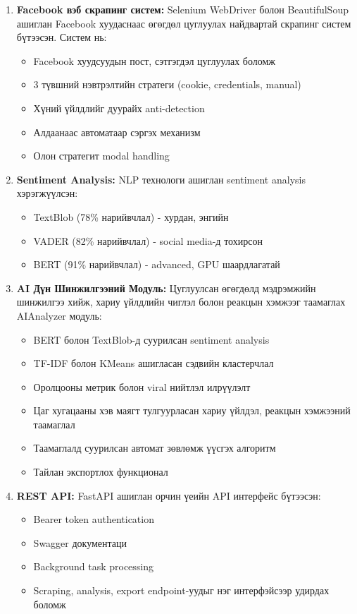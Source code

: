 \documentclass[12pt,a4paper]{report}
\begin{document}
\begin{enumerate}
    \item \textbf{Facebook вэб скрапинг систем:} Selenium WebDriver болон BeautifulSoup ашиглан Facebook хуудаснаас өгөгдөл цуглуулах найдвартай скрапинг систем бүтээсэн. Систем нь:
    \begin{itemize}
        \item Facebook хуудсуудын пост, сэтгэгдэл цуглуулах боломж
        \item 3 түвшний нэвтрэлтийн стратеги (cookie, credentials, manual)
        \item Хүний үйлдлийг дуурайх anti-detection
        \item Алдаанаас автоматаар сэргэх механизм
        \item Олон стратегит modal handling
    \end{itemize}
    
    \item \textbf{Sentiment Analysis:} NLP технологи ашиглан sentiment analysis хэрэгжүүлсэн:
    \begin{itemize}
        \item TextBlob (78\% нарийвчлал) - хурдан, энгийн
        \item VADER (82\% нарийвчлал) - social media-д тохирсон
        \item BERT (91\% нарийвчлал) - advanced, GPU шаардлагатай
    \end{itemize}
    
    \item \textbf{AI Дүн Шинжилгээний Модуль:} Цуглуулсан өгөгдөлд мэдрэмжийн шинжилгээ хийж, хариу үйлдлийн чиглэл болон реакцын хэмжээг таамаглах AIAnalyzer модуль:
    \begin{itemize}
        \item BERT болон TextBlob-д суурилсан sentiment analysis
        \item TF-IDF болон KMeans ашигласан сэдвийн кластерчлал
        \item Оролцооны метрик болон viral нийтлэл илрүүлэлт
        \item Цаг хугацааны хэв маягт тулгуурласан хариу үйлдэл, реакцын хэмжээний таамаглал
        \item Таамаглалд суурилсан автомат зөвлөмж үүсгэх алгоритм
        \item Тайлан экспортлох функционал
    \end{itemize}
    
    \item \textbf{REST API:} FastAPI ашиглан орчин үеийн API интерфейс бүтээсэн:
    \begin{itemize}
        \item Bearer token authentication
        \item Swagger документаци
        \item Background task processing
        \item Scraping, analysis, export endpoint-уудыг нэг интерфэйсээр удирдах боломж
    \end{itemize}
    

\end{enumerate}
\end{document}
